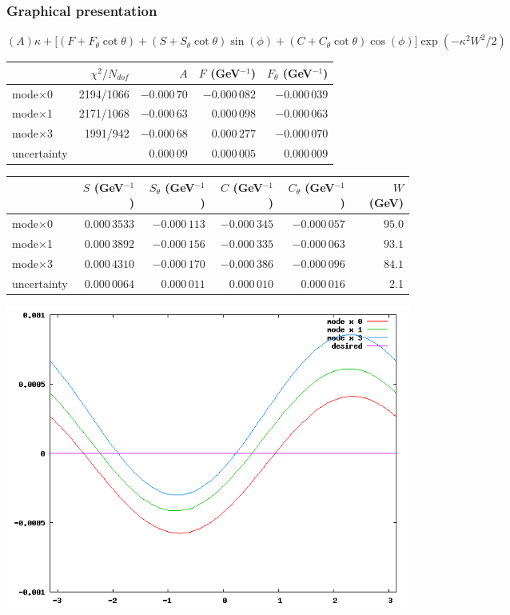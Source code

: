 \documentclass[compress]{beamer}
\begin{document}
\begin{frame}
\frametitle{Graphical presentation}

\scriptsize

$(A)\kappa + \big[(F + F_{\theta}\cot\theta) + (S + S_{\theta}\cot\theta)\sin(\phi) + (C + C_{\theta}\cot\theta)\cos(\phi)\big]\exp(-\kappa^2 W^2 / 2)$

\vfill

\begin{tabular}{l r r r r}
 & $\chi^2/N_{dof}$ & $A$\hspace{0.35 cm} & $F$ (GeV$^{-1}$) & $F_{\theta}$ (GeV$^{-1}$) \\\hline
mode$\times$0 & 2194/1066 & $-0.000\,70$ & $-0.000\,082$ & $-0.000\,039$ \\
mode$\times$1 & 2171/1068 & $-0.000\,63$ & $0.000\,098$ & $-0.000\,063$  \\
mode$\times$3 & 1991/942 & $-0.000\,68$ & $0.000\,277$ & $-0.000\,070$ \\\hline
uncertainty & & $0.000\,09$ & $0.000\,005$ & $0.000\,009$ \\
\end{tabular}

\vfill
\hfill \begin{tabular}{l r r r r r}
& $S$ (GeV$^{-1}$) & $S_{\theta}$ (GeV$^{-1}$) & $C$ (GeV$^{-1}$) & $C_{\theta}$ (GeV$^{-1}$) & $W$ (GeV) \\\hline
mode$\times$0 & $0.000\,3533$ & $-0.000\,113$ & $-0.000\,345$ & $-0.000\,057$ & $95.0$ \\
mode$\times$1 & $0.000\,3892$ & $-0.000\,156$ & $-0.000\,335$ & $-0.000\,063$ & $93.1$ \\
mode$\times$3 & $0.000\,4310$ & $-0.000\,170$ & $-0.000\,386$ & $-0.000\,096$ & $84.1$ \\\hline
uncertainty & $0.000\,0064$ & $0.000\,011$ & $0.000\,010$ & $0.000\,016$ & 2.1 \\
\end{tabular}

\begin{center}
\includegraphics[width=0.4\linewidth]{modes.png}
\end{center}
\end{frame}
\end{document}
